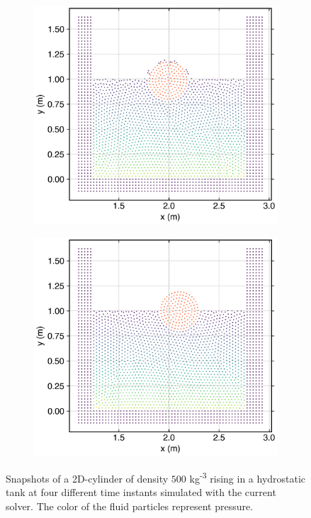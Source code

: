 \begin{figure}[!htpb]
  \begin{subfigure}{0.48\textwidth}
    \centering
    \includegraphics[width=1.0\textwidth]{figures/rfc/figures/dinesh_2022_body_in_hs_tank_2d/time6}
  \end{subfigure}
  \begin{subfigure}{0.48\textwidth}
    \centering
    \includegraphics[width=1.0\textwidth]{figures/rfc/figures/dinesh_2022_body_in_hs_tank_2d/time11}
  \end{subfigure}
  \caption{Snapshots of a 2D-cylinder of density $500$ kg\textsuperscript{-3}
    rising in a hydrostatic tank at four different time instants simulated
    with the current solver. The color of the fluid particles represent pressure.}
\label{fig:snapshots-rising-solid-in-water}
\end{figure}
